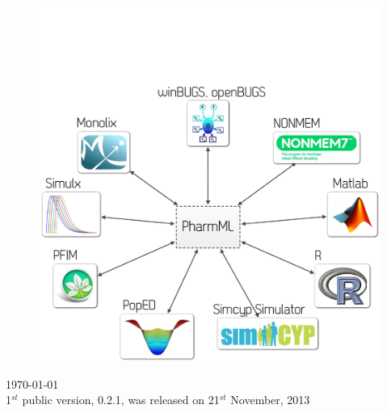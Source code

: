 \begin{titlepage}
\begin{center}
%
%
\begin{figure}[htb]
\centering
  \includegraphics[width=0.60\linewidth]{pics/coverFigure}
 \label{fig:platformDDMoRe}
\end{figure}


\vfill

{\large \today \\}
{1$^{st}$ public version, 0.2.1, was released on 21$^{st}$ November, 2013}

\end{center}
\end{titlepage}